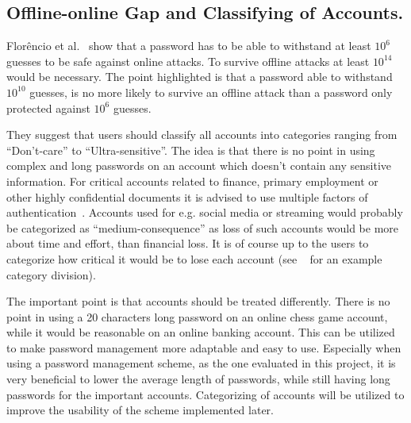 \subsection{Offline-online Gap and Classifying of Accounts.}\label{classification} Florêncio et al.~\cite{guide-pws} show that a password has to be able to withstand at least $10^6$ guesses to be safe against online attacks. To survive offline attacks at least $10^{14}$ would be necessary. The point highlighted is that a password able to withstand $10^{10}$ guesses, is no more likely to survive an offline attack than a password only protected against $10^6$ guesses. 
\par They suggest that users should classify all accounts into categories ranging from ``Don't-care'' to ``Ultra-sensitive''. The idea is that there is no point in using complex and long passwords on an account which doesn't contain any sensitive information. For critical accounts related to finance, primary employment or other highly confidential documents it is advised to use multiple factors of authentication~\cite{2-factor-auth}. Accounts used for e.g. social media or streaming would probably be categorized as ``medium-consequence'' as loss of such accounts would be more about time and effort, than financial loss. It is of course up to the users to categorize how critical it would be to lose each account (see ~\cite{guide-pws} for an example category division). 
\par The important point is that accounts should be treated differently. There is no point in using a 20 characters long password on an online chess game account, while it would be reasonable on an online banking account. This can be utilized to make password management more adaptable and easy to use. Especially when using a password management scheme, as the one evaluated in this project, it is very beneficial to lower the average length of passwords, while still having long passwords for the important accounts. Categorizing of accounts will be utilized to improve the usability of the scheme implemented later.



